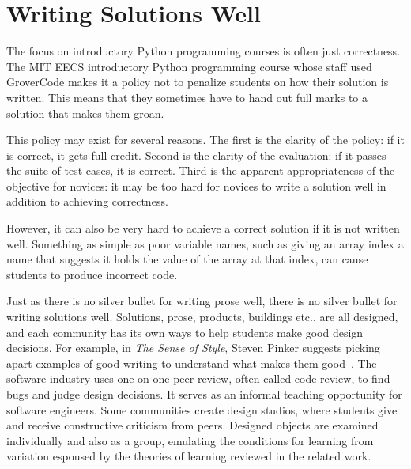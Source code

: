 


\section{Writing Solutions Well}

The focus on introductory Python programming courses is often just correctness. The MIT EECS introductory Python programming course whose staff used GroverCode makes it a policy not to penalize students on how their solution is written. This means that they sometimes have to hand out full marks to a solution that makes them groan.

This policy may exist for several reasons. The first is the clarity of the policy: if it is correct, it gets full credit. Second is the clarity of the evaluation: if it passes the suite of test cases, it is correct. Third is the apparent appropriateness of the objective for novices: it may be too hard for novices to write a solution well in addition to achieving correctness. %

However, it can also be very hard to achieve a correct solution if it is not written well. Something as simple as poor variable names, such as giving an array index a name that suggests it holds the value of the array at that index, can cause students to produce incorrect code.

Just as there is no silver bullet for writing prose well, there is no silver bullet for writing solutions well. Solutions, prose, products, buildings etc., are all designed, and each community has its own ways to help students make good design decisions. For example, in {\it The Sense of Style}, Steven Pinker suggests picking apart examples of good writing to understand what makes them good~\cite{pinkersense}. The software industry uses one-on-one peer review, often called code review, to find bugs and judge design decisions. It serves as an informal teaching opportunity for software engineers. Some communities create design studios, where students give and receive constructive criticism from peers. Designed objects are examined individually and also as a group, emulating the conditions for learning from variation espoused by the theories of learning reviewed in the related work. 

